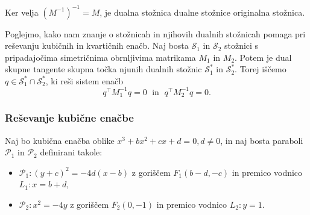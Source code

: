 


\begin{opomba}
    Ker velja $\left(M^{-1}\right)^{-1} = M$, je dualna stožnica dualne stožnice originalna stožnica.
\end{opomba}

Poglejmo, kako nam znanje o stožnicah in njihovih dualnih stožnicah pomaga pri reševanju kubičnih in kvartičnih enačb. Naj bosta $\mathcal{S}_1$ in $\mathcal{S}_2$ stožnici s pripadajočima simetričnima obrnljivima matrikama $M_1$ in $M_2$. Potem je dual skupne tangente skupna točka njunih dualnih stožnic $\mathcal{S}^*_1$ in $\mathcal{S}^*_2$. Torej iščemo $q \in \mathcal{S}^*_1 \cap \mathcal{S}^*_2$, ki reši sistem enačb
\begin{equation}
    \label{eq:afin_sistem_tangenta_splosen}
    q^\intercal M^{-1}_1 q = 0 \; \text{ in } \; q^\intercal M^{-1}_2 q = 0.
\end{equation}

\subsubsection*{Reševanje kubične enačbe}

Naj bo kubična enačba oblike $ x^3 + bx^2 + cx + d = 0, d \neq 0$, in naj bosta paraboli $\mathcal{P}_1$ in $\mathcal{P}_2$ definirani takole:
\begin{itemize}
    \item $\mathcal{P}_1: (y+c)^2 = -4d(x-b)$ z goriščem $F_1 (b - d, -c)$ in premico vodnico $L_1: x = b + d$,
    \item $\mathcal{P}_2: x^2 = -4y$ z goriščem $F_2 (0, -1)$ in premico vodnico $L_2: y = 1$.
\end{itemize}

